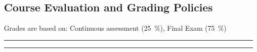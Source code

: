 \subsection*{Course Evaluation and Grading Policies}
Grades are based on:
Continuous assessment (\qty{25}{\percent}),
Final Exam (\qty{75}{\percent})
\vspace{2ex}\hrule
\vspace{2ex}\hrule\vspace{2ex}



